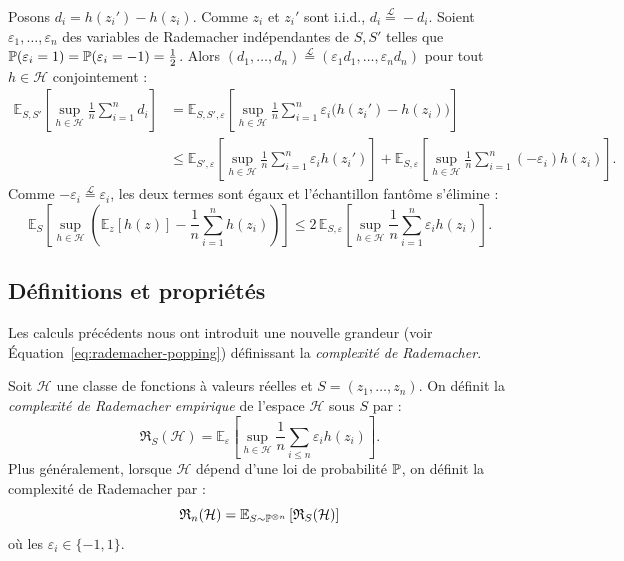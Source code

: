 \begin{proposition}
    Posons $d_i = h(z_i') - h(z_i)$. Comme $z_i$ et $z_i'$ sont i.i.d., $d_i \overset{\mathcal{L}}{=} -d_i$. Soient $\varepsilon_1, \dots, \varepsilon_n$ des variables de Rademacher indépendantes de $S, S'$ telles que $\mathbb{P}(\varepsilon_i = 1) = \mathbb{P}(\varepsilon_i = -1) = \frac{1}{2}$. Alors $(d_1, \dots, d_n) \overset{\mathcal{L}}{=} (\varepsilon_1 d_1, \dots, \varepsilon_n d_n)$ pour tout $h \in \mathcal{H}$ conjointement :
    \begin{align*}
        \mathbb{E}_{S, S'} \left[ \sup_{h \in \mathcal{H}} \frac{1}{n} \sum_{i=1}^n d_i \right] 
        &= \mathbb{E}_{S, S', \varepsilon} \left[ \sup_{h \in \mathcal{H}} \frac{1}{n} \sum_{i=1}^n \varepsilon_i \big(h(z_i') - h(z_i)\big) \right] \\
        &\leqslant \mathbb{E}_{S', \varepsilon} \left[ \sup_{h \in \mathcal{H}} \frac{1}{n} \sum_{i=1}^n \varepsilon_i h(z_i') \right] + \mathbb{E}_{S, \varepsilon} \left[ \sup_{h \in \mathcal{H}} \frac{1}{n} \sum_{i=1}^n (-\varepsilon_i) h(z_i) \right].
    \end{align*}
    Comme $-\varepsilon_i \overset{\mathcal{L}}{=} \varepsilon_i$, les deux termes sont égaux et l'échantillon fantôme s'élimine :
    \begin{equation}
        \mathbb{E}_S \left[ \sup_{h \in \mathcal{H}} \left( \mathbb{E}_z[h(z)] - \frac{1}{n} \sum_{i=1}^n h(z_i) \right) \right] \leqslant 2 \, \mathbb{E}_{S, \varepsilon} \left[ \sup_{h \in \mathcal{H}} \frac{1}{n} \sum_{i=1}^n \varepsilon_i h(z_i) \right]. \label{eq:rademacher-popping}
    \end{equation}
\end{proposition}

\subsection{Définitions et propriétés}

Les calculs précédents nous ont introduit une nouvelle grandeur (voir Équation~\ref{eq:rademacher-popping}) définissant la \emph{complexité de Rademacher}. 

\begin{definition}
    Soit $ \mathcal{H}$ une classe de fonctions à valeurs réelles et $ S = (z_1, \dots, z_n)$. On définit la \emph{complexité de Rademacher empirique} de l'espace $ \mathcal{H}$ sous $S$ par : 
    \begin{equation}
        \mathfrak{R}_S( \mathcal{H}) = \mathbb{E}_{ \varepsilon} \left[ \underset{h \in \mathcal{H}}{\sup} \frac{1}{n} \sum_{i \leqslant n} \varepsilon_i h(z_i)\right]. 
    \end{equation}
    Plus généralement, lorsque $ \mathcal{H}$ dépend d'une loi de probabilité $ \mathbb{P}$, on définit la complexité de Rademacher par : 
    \begin{equation}
        \mathfrak{R}_n( \mathcal{H}) = \mathbb{E}_{S \sim \mathbb{P}^{\otimes n}}\left[\mathfrak{R}_S( \mathcal{H})\right] 
    \end{equation}
    où les $ \varepsilon_i \in \{-1, 1\}$. 
\end{definition}

